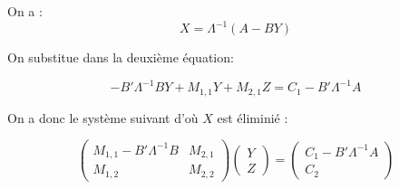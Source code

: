 On a :
\begin{equation}
    X = \Lambda^{-1} (A-BY)
\end{equation}

On substitue  dans la deuxi\`eme \'equation:

\begin{equation}
        -B' \Lambda^{-1} BY  +  M_{1,1}Y +  M_{2,1} Z  = C_1 -B'\Lambda^{-1} A
\end{equation}

On a donc le syst\`eme suivant d'o\`u $X$ est \'elimini\'e :

\begin{equation}
 \begin{pmatrix}  
                   M_{1,1} -B' \Lambda^{-1} B & M_{2,1}  \\    
	           M_{1,2} &  M_{2,2}
  \end{pmatrix}
   \begin{pmatrix}  Y \\ Z \end{pmatrix}
   = \begin{pmatrix}  C_1 -B'\Lambda^{-1} A \\  C_2 \end{pmatrix}
\end{equation}
